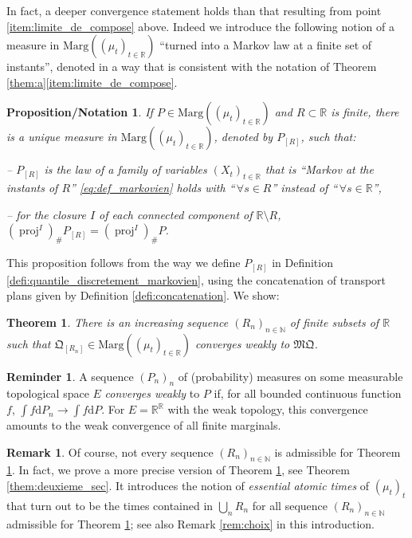 \documentclass[JEP,XML,SOM,Unicode,NoEqCountersInSection,NoFloatCountersInSection,published]{cedram}
\theoremstyle{plain}
\newtheorem{themBJ}{Theorem}
\newtheorem{pronotation}[them]{Proposition/Notation}
\theoremstyle{definition}
\newtheorem{rem}[them]{Remark}
\newtheorem{reminder}[them]{Reminder}
\newcommand{\dd}{\mathrm{d}}
\newcommand{\como}{\mathfrak{Q}}
\newcommand{\mq}{\mathfrak{MQ}}
\newcommand{\ma}{\mathrm{Marg}}
\newcommand{\R}{\mathbb{R}}
\newcommand{\N}{\mathbb{N}}
\newcommand{\pr}{\operatorname{proj}}
\begin{document}
In fact, a deeper convergence statement holds than that resulting from point \eqref{item:limite_de_compose} above. Indeed we introduce the following notion of a measure in $\ma((\mu_t)_{t\in\R})$ ``turned into a Markov law at a finite set of instants'', denoted in a way that is consistent with the notation of Theorem \ref{them:a}\eqref{item:limite_de_compose}.

\begin{pronotation}\label{pro:markovinise_fini1} If $P\in\ma((\mu_t)_{t\in\R})$ and $R\subset \R$ is finite, there is a unique measure in $\ma((\mu_t)_{t\in\R})$, denoted by $P_{[R]}$, such that:

-- $P_{[R]}$ is the law of a family of variables $(X_t)_{t\in\R}$ that is ``Markov at the instants of\/ $R$'' \ie \eqref{eq:def_markovien} holds with ``$\,\forall s\in R$'' instead of ``$\,\forall s\in\R$'',

-- for the closure $I$ of each connected component of $\R\setminus R$, $(\pr^I)_\# P_{[R]}=(\pr^I)_\# P$.
\end{pronotation}

This proposition follows from the way we define $P_{[R]}$ in Definition \ref{defi:quantile_discretement_markovien}, using the concatenation of transport plans given by Definition \ref{defi:concatenation}. We show:

\begin{themBJ}\label{them:b}There is an increasing sequence $(R_n)_{n\in\N}$ of finite subsets of $\R$ such that $\como_{[R_n]}\in\ma((\mu_t)_{t\in\R})$ converges weakly to $\mq$.
\end{themBJ}

\begin{reminder}\label{reminder:weak_convergence} A sequence $(P_n)_n$ of (probability) measures on some measurable topological space $E$ \emph{converges weakly} to $P$ if, for all bounded continuous function $f$, $\int f\dd P_n\to\int f\dd P$. For $E=\R^\R$ with the weak topology, this convergence amounts to the weak convergence of all finite marginals.
\end{reminder}

\begin{rem} Of course, not every sequence $(R_n)_{n\in \N}$ is admissible for Theorem \ref{them:b}. In fact, we prove a more precise version of Theorem \ref{them:b}, see Theorem \ref{them:deuxieme_sec}. It introduces the notion of \emph{essential atomic times} of $(\mu_t)_t$ that turn out to be the times contained in $\bigcup_n R_n$ for all sequence $(R_n)_{n\in \N}$ admissible for Theorem \ref{them:b}; see also Remark \ref{rem:choix} in this introduction.
\end{rem}
\end{document}

